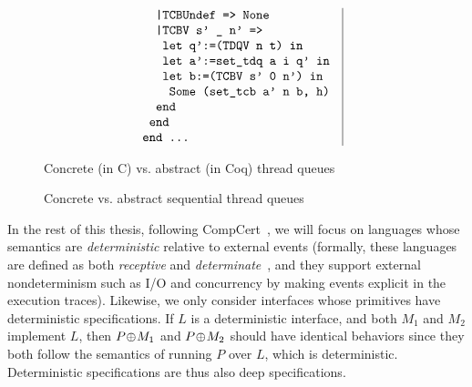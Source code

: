 {\begin{figure}[t]
$$\begin{array}{l|l}
\begin{array}[t]{l}
\verb+  |TCBUndef => None+\\
\verb+  |TCBV s' _ n' =>+\\
\verb+   let q':=(TDQV n t) in+\\
\verb+   let a':=set_tdq a i q' in+\\
\verb+   let b:=(TCBV s' 0 n') in+\\
\verb+    Some (set_tcb a' n b, h)+\\
\verb+  end+\\
\verb+ end+\\
\verb+end ...+
\end{array}
\end{array}
$$ 
\caption{Concrete (in C) vs. abstract (in Coq) thread queues}
\label{fig:queue}
\end{figure}}

\begin{figure}[tb]\centering
\subfloat[Concrete implementation in C]{
\label{fig:queue:c:a}
    \begin{minipage}{0.5\textwidth}
    \centering
 = C] {source_code/seq-dequeue.c}
    \end{minipage}
}
\subfloat[Abstract specification in Coq]
{\label{fig:queue:c:b}
    \begin{minipage}{0.5\textwidth}
    \centering
 = C] {source_code/seq-dequeue.v}
  \end{minipage}
}\caption{Concrete vs. abstract sequential thread queues}
\hrulefill
\label{fig:queue}
\end{figure}

In the rest of this thesis, following CompCert~\cite{Leroy-backend}, we
will focus on languages whose semantics are {\em
  deterministic} relative to external events (formally, these
languages are defined as both {\em receptive} and {\em
  determinate}~\cite{sevcik13}, and they support external
nondeterminism such as I/O and concurrency by making events explicit 
in the execution traces).
Likewise, we only consider interfaces whose primitives
have deterministic specifications. If $L$ is a deterministic interface, 
and both $M_1$ and $M_2$ implement $L$, then $P\!\oplus\! M_1$ and $P\!\oplus\! M_2$
should have identical behaviors since they both follow the semantics
of running $P$ over $L$, which is deterministic. Deterministic 
specifications are thus also deep specifications.

